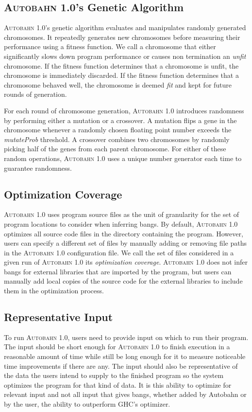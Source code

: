 \documentclass[format=sigplan, review=true]{acmart}
\newcommand{\unfit}[0]{unfit}
\newcommand{\Ao}[0]{\textsc{Autobahn 1.0}}
\newcommand{\fit}[0]{fit}
\begin{document}
\subsection{\Ao{}'s Genetic Algorithm}

\Ao{}'s genetic algorithm evaluates and manipulates randomly generated
chromosomes. It repeatedly generates new chromosomes before measuring
their performance using a fitness function. We call a chromosome that
either significantly slows down program performance or causes non
termination an \textit{\unfit{}} chromosome. If the fitness function
determines that a chromosome is \unfit{}, the chromosome is
immediately discarded. If the fitness function determines that a
chromosome behaved well, the chromosome is deemed \textit{\fit{}} and
kept for future rounds of generation.

For each round of chromosome generation, \Ao{} introduces randomness
by performing either a mutation or a crossover. A mutation flips a
gene in the chromosome whenever a randomly chosen floating point
number exceeds the \textit{mutateProb} threshold. A crossover combines
two chromosomes by randomly picking half of the genes from each parent
chromosome. For either of these random operations, \Ao{} uses a unique
number generator each time to guarantee randomness.

\subsection{Optimization Coverage}
\Ao{} uses program source files as the unit of granularity for 
the set of program locations to consider when inferring bangs.  By
default, \Ao{} optimizes all source code files in the directory
containing the program. However, users can specify a different set of
files by manually adding or removing file paths in the \Ao{}
configuration file.  We call the set of files considered in a given
run of \Ao{} its \textit{optimization coverage}.
\Ao{} does not infer bangs for external libraries
that are imported by the program, but users can manually add local
copies of the source code for the external libraries to include them in the optimization process.


\subsection{Representative Input}
To run \Ao{}, users need to provide input on which to run their
program. The input should be short enough for \Ao{} to finish
execution in a reasonable amount of time while still be long enough
for it to measure noticeable time improvements if there are
any.  The input should also be representative of the data the users
intend to supply to the finished program so the system optimizes the
program for that kind of data.  It is this ability to optimize for
relevant input and not all input that gives bangs, whether added by
Autobahn or by the user, the ability to outperform GHC's optimizer. 
\end{document}
